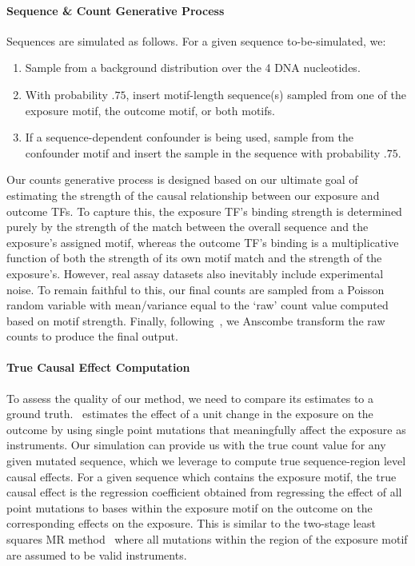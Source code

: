 \paragraph{Sequence \& Count Generative Process}
Sequences are simulated as follows. For a given sequence to-be-simulated, we:
\begin{enumerate}
	\item Sample from a background distribution over the 4 DNA nucleotides.
	\item With probability \( .75 \), insert motif-length sequence(s) sampled from one of the exposure motif, the outcome motif, or both motifs.
	\item If a sequence-dependent confounder is being used, sample from the confounder motif and insert the sample in the sequence with probability \( .75 \).
\end{enumerate}

Our counts generative process is designed based on our ultimate goal of estimating the strength of the causal relationship between our exposure and outcome TFs. To capture this, the exposure TF's binding strength is determined purely by the strength of the match between the overall sequence and the exposure's assigned motif, whereas the outcome TF's binding is a multiplicative function of both the strength of its own motif match and the strength of the exposure's. However, real assay datasets also inevitably include experimental noise. To remain faithful to this, our final counts are sampled from a Poisson random variable with mean/variance equal to the `raw' count value computed based on motif strength. Finally, following~\cite{finkelstein2020look}, we Anscombe transform the raw counts to produce the final output.

\paragraph{True Causal Effect Computation}
To assess the quality of our method, we need to compare its estimates to a ground truth. \method\ estimates the effect of a unit change in the exposure on the outcome by using single point mutations that meaningfully affect the exposure as instruments. Our simulation can provide us with the true count value for any given mutated sequence, which we leverage to compute true sequence-region level causal effects. For a given sequence which contains the exposure motif, the true causal effect is the regression coefficient obtained from regressing the effect of all point mutations to bases within the exposure motif on the outcome on the corresponding effects on the exposure. This is similar to the two-stage least squares MR method~\citep{angrist1995two} where all mutations within the region of the exposure motif are assumed to be valid instruments.

